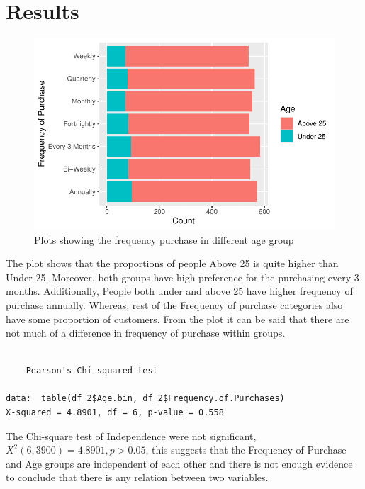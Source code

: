 \documentclass[
  letterpaper,
  DIV=11,
  numbers=noendperiod]{scrartcl}
\begin{document}
\section{Results}\label{results}

\begin{figure}[H]

{\centering \includegraphics{Customer_Preference_Analytics_files/figure-pdf/unnamed-chunk-22-1.pdf}

}

\caption{Plots showing the frequency purchase in different age group}

\end{figure}%

The plot shows that the proportions of people Above 25 is quite higher
than Under 25. Moreover, both groups have high preference for the
purchasing every 3 months. Additionally, People both under and above 25
have higher frequency of purchase annually. Whereas, rest of the
Frequency of purchase categories also have some proportion of customers.
From the plot it can be said that there are not much of a difference in
frequency of purchase within groups.

\begin{verbatim}

    Pearson's Chi-squared test

data:  table(df_2$Age.bin, df_2$Frequency.of.Purchases)
X-squared = 4.8901, df = 6, p-value = 0.558
\end{verbatim}

The Chi-square test of Independence were not significant,
\(X^{2}(6, 3900) = 4.8901, p > 0.05\), this suggests that the Frequency
of Purchase and Age groups are independent of each other and there is
not enough evidence to conclude that there is any relation between two
variables.
\end{document}
